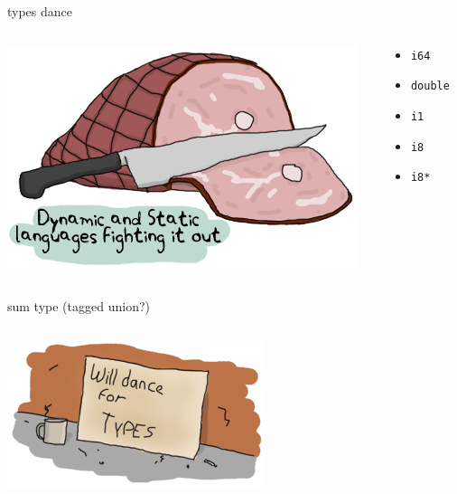 \documentclass{beamer}
\begin{document}
\begin{frame}{types dance}
  \begin{columns}
    \begin{column}[b]{5.5cm}
      \includegraphics[scale=0.4]{dynamic-static-types}
    \end{column}
    \begin{column}[b]{4.5cm}
      \begin{itemize}
      \item[] \texttt{i64}
      \item[] \texttt{double}
      \item[] \texttt{i1}
      \item[] \texttt{i8}
      \item[] \texttt{i8*}
      \end{itemize}
    \end{column}
  \end{columns}
\end{frame}

\begin{frame}{sum type (tagged union?)}
  \begin{columns}
    \begin{column}[b]{5.5cm}
      \includegraphics[scale=0.4]{types-dance}
    \end{column}
    \begin{column}[b]{4.5cm}
      
    \end{column}
  \end{columns}
\end{frame}
\end{document}

